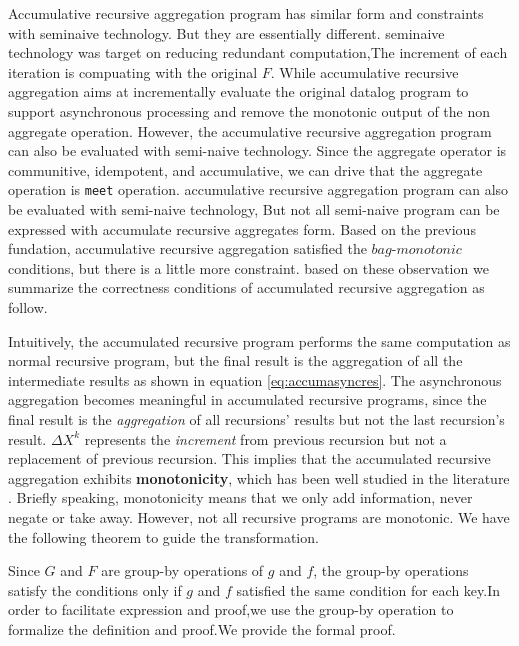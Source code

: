 {{\color{red}
Accumulative recursive aggregation program has similar form and constraints with seminaive technology. But they are essentially different.
seminaive technology was target on reducing redundant computation,The increment of each iteration is compuating with the original $F$. While accumulative recursive aggregation aims at incrementally evaluate the original datalog program to support asynchronous processing and remove the monotonic output of the non aggregate operation. However, the accumulative recursive aggregation program can also be evaluated with semi-naive technology. Since the aggregate operator is communitive, idempotent, and accumulative, we can drive that the aggregate operation is \texttt{meet} operation.
}
{\color{green}	
accumulative recursive aggregation program can also be evaluated with semi-naive technology, 
But not all semi-naive program can be expressed with accumulate recursive aggregates form.  %
Based on the previous fundation, accumulative recursive aggregation  satisfied the $bag$-$monotonic$ conditions, but there is a little more constraint.
based on these observation we summarize the correctness conditions of accumulated recursive aggregation as follow.
}


{\color{green}
Intuitively, the accumulated recursive program performs the same computation as normal recursive program, but the final result is the aggregation of all the intermediate results as shown in equation \ref{eq:accumasyncres}. The asynchronous aggregation becomes meaningful in accumulated recursive programs, since the final result is the \emph{aggregation} of all recursions' results but not the last recursion's result. $\Delta X^{k}$ represents the \emph{increment} from previous recursion but not a replacement of previous recursion. This implies that the accumulated recursive aggregation exhibits \textbf{monotonicity}, which has been well studied in the literature \cite{Hellerstein:2010:DIE:1860702.1860704,calm,Lam:2013:SDE:2510649.2511289,Wang:2015:AFR:2824032.2824052}. Briefly speaking, monotonicity means that we only add information, never negate or take away. However, not all recursive programs are monotonic. We have the following theorem to guide the transformation.
}

{\color{green}
Since $G$ and $F$ are group-by operations of $g$ and $f$, the group-by operations satisfy the conditions only if $g$ and $f$ satisfied the same condition for each key.In order to facilitate expression and proof,we use the group-by operation to formalize the definition and proof.We provide the formal proof.}

}
